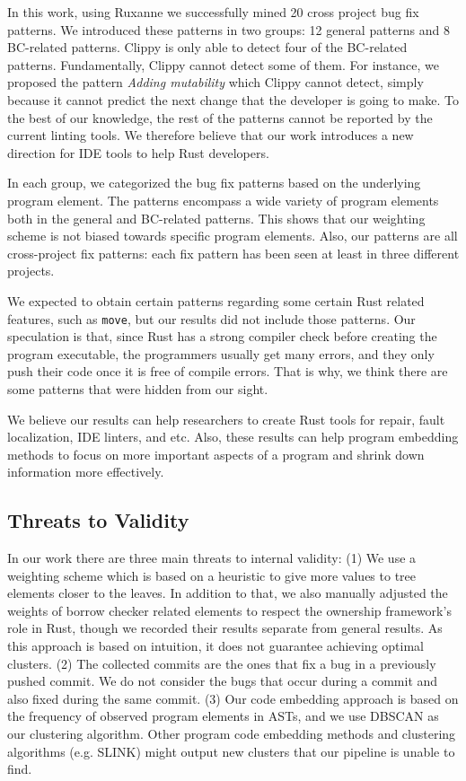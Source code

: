 In this work, using Ruxanne we successfully mined 20 cross project bug fix patterns. We introduced these patterns in two groups: 12 general patterns and 8 BC-related patterns. Clippy is only able to detect four of the BC-related patterns. Fundamentally, Clippy cannot detect some of them. For instance, we proposed the pattern \textit{Adding mutability} which Clippy cannot detect, simply because it cannot predict the next change that the developer is going to make. To the best of our knowledge, the rest of the patterns cannot be reported by the current linting tools. We therefore believe that our work introduces a new direction for IDE tools to help Rust developers.

In each group, we categorized the bug fix patterns based on the underlying program element. The patterns encompass a wide variety of program elements both in the general and BC-related patterns. This shows that our weighting scheme is not biased towards specific program elements. Also, our patterns are all cross-project fix patterns: each fix pattern has been seen at least in three different projects.

We expected to obtain certain patterns regarding some certain Rust related features, such as \verb+move+, but our results did not include those patterns. Our speculation is that, since Rust has a strong compiler check before creating the program executable, the programmers usually get many errors, and they only push their code once it is free of compile errors. That is why, we think there are some patterns that were hidden from our sight.

We believe our results can help researchers to create Rust tools for repair, fault localization, IDE linters, and etc. Also, these results can help program embedding methods to focus on more important aspects of a program and shrink down information more effectively.

\subsection{Threats to Validity}

In our work there are three main threats to internal validity: (1) We use a weighting scheme which is based on a heuristic to give more values to tree elements closer to the leaves. In addition to that, we also manually adjusted the weights of borrow checker related elements to respect the ownership framework's role in Rust, though we recorded their results separate from general results. As this approach is based on intuition, it does not guarantee achieving optimal clusters. (2) The collected commits are the ones that fix a bug in a previously pushed commit. We do not consider the bugs that occur during a commit and also fixed during the same commit. (3) Our code embedding approach is based on the frequency of observed program elements in ASTs, and we use DBSCAN as our clustering algorithm. Other program code embedding methods and clustering algorithms (e.g. SLINK) might output new clusters that our pipeline is unable to find. 

